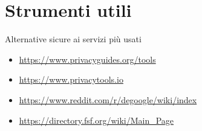 



\subtitle{Parte 2 - Il mantello dell'invisibilità}
\date{2 Maggio 2022}
\maketitle







\section{Strumenti utili}
\begin{myframe}{Alternative sicure ai servizi più usati}
  \begin{itemize}
    \item \url{https://www.privacyguides.org/tools}
    \item \url{https://www.privacytools.io}
    \item \url{https://www.reddit.com/r/degoogle/wiki/index}
    \item \url{https://directory.fsf.org/wiki/Main_Page}
  \end{itemize}
\end{myframe}


